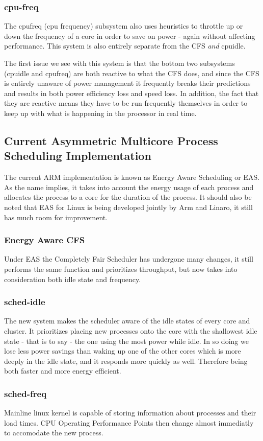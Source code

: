 \subsubsection{cpu-freq}
The cpufreq (cpu frequency) subsystem also uses heuristics to throttle up or down the frequency of a core in order to save on power - again without affecting performance. This system is also entirely separate from the CFS \textit{and} cpuidle. \cite{EAS2015}

The first issue we see with this system is that the bottom two subsystems (cpuidle and cpufreq) are both reactive to what the CFS does, and since the CFS is entirely unaware of power management it frequently breaks their predictions and results in both power efficiency loss and speed loss. In addition, the fact that they are reactive means they have to be run frequently themselves in order to keep up with what is happening in the processor in real time. \cite{EAS2015}

\subsection{Current Asymmetric Multicore Process Scheduling Implementation}
The current ARM implementation is known as Energy Aware Scheduling or EAS. As the name implies, it takes into account the energy usage of each process and allocates the process to a core for the duration of the process. It should also be noted that EAS for Linux is being developed jointly by Arm and Linaro, it still has much room for improvement.\cite{EASp2015}

\subsubsection{Energy Aware CFS}
Under EAS the Completely Fair Scheduler has undergone many changes, it still performs the same function and prioritizes throughput, but now takes into consideration both idle state and frequency. \cite{EASp2015}

\subsubsection{sched-idle}
The new system makes the scheduler aware of the idle states of every core and cluster. It prioritizes placing new processes onto the core with the shallowest idle state - that is to say - the one using the most power while idle. In so doing we lose less power savings than waking up one of the other cores which is more deeply in the idle state, and it responds more quickly as well. Therefore being both faster and more energy efficient. \cite{EASp2015}

\subsubsection{sched-freq}
Mainline linux kernel is capable of storing information about processes and their load times. CPU Operating Performance Points then change almost immediatly to accomodate the new process. \cite{EASp2015}